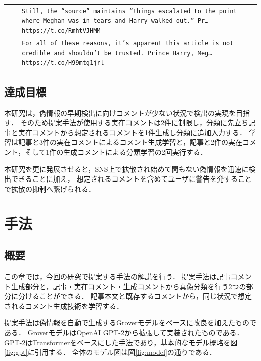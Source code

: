 \begin{landscape}
\begin{table}[h]
\begin{tabularx}{\linewidth}{llX}
                              &                             & \texttt{Still, the ``source'' maintains ``things escalated to the point where Meghan was in tears and Harry walked out.'' Pr… https://t.co/RmhtVJHMM}\\ \cline{3-3}
                              &                             & \texttt{For all of these reasons, it’s apparent this article is not credible and shouldn’t be trusted. Prince Harry, Meg… https://t.co/H99mtg1jrl}\\ \hline
    \end{tabularx}
\end{table} 
\end{landscape} 

\newpage
\subsection{達成目標}
本研究は，偽情報の早期検出に向けコメントが少ない状況で検出の実現を目指す．
そのため提案手法が使用する実在コメントは2件に制限し，分類に先立ち記事と実在コメントから想定されるコメントを1件生成し分類に追加入力する．
学習は記事と3件の実在コメントによるコメント生成学習と，記事と2件の実在コメント，そして1件の生成コメントによる分類学習の2回実行する．

本研究を更に発展させると，SNS上で拡散され始めて間もない偽情報を迅速に検出できることに加え，
想定されるコメントを含めてユーザに警告を発することで拡散の抑制へ繋げられる．

\section{手法}\label{cpt:gen_mtd}
\subsection{概要}
\label{sec:method_overall}
この章では，今回の研究で提案する手法の解説を行う．
提案手法は記事コメント生成部分と，記事・実在コメント・生成コメントから真偽分類を行う2つの部分に分けることができる．
記事本文と既存するコメントから，同じ状況で想定されるコメント生成技術を学習する．

提案手法は偽情報を自動で生成するGroverモデルをベースに改良を加えたものである．
GroverモデルはOpenAI GPT-2\cite{Radford_GPT2}から拡張して実装されたものである\cite{Shu:2017:FND:3137597.3137600}．
GPT-2はTransformerをベースにした手法であり，基本的なモデル概略を図\ref{fig:gpt}に引用する\cite{radford2018improving}．
全体のモデル図は図\ref{fig:model}の通りである．

